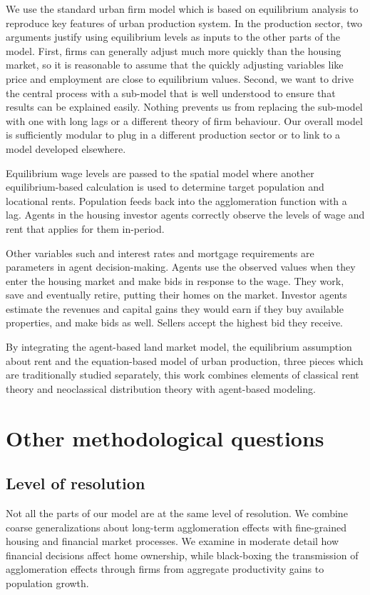 We use the standard urban firm model which is based on equilibrium analysis to reproduce key features of urban production system. In the production sector, two arguments justify using equilibrium levels as inputs to the other parts of the model. First, firms can generally adjust much more quickly than the housing market, so it is reasonable to assume that the quickly adjusting variables like price and employment are close to equilibrium values.  Second, we want to drive the central process with a sub-model that is well understood to ensure that results can be explained easily. Nothing prevents us from replacing the sub-model with one with long lags or a different theory of firm behaviour. Our overall model is sufficiently modular to plug in a different production sector or to link to a model developed elsewhere.

Equilibrium wage levels are passed to the spatial model where another equilibrium-based calculation is used to determine target population and locational rents. Population feeds back into the  agglomeration function with a lag. Agents in the housing investor agents correctly observe the levels of wage and rent that applies for them in-period. 

Other variables such and interest rates and mortgage requirements are parameters in agent decision-making. Agents use the observed values when they enter the housing market and make bids in response to the wage. They work, save and eventually retire, putting their homes on the market. Investor agents estimate the revenues and capital gains they would earn if they buy available properties, and make bids as well. Sellers accept the highest bid they receive. 

By integrating the agent-based land market model, the equilibrium assumption about rent and the equation-based model of urban production, three pieces which are traditionally studied separately, this work combines elements of classical rent theory and neoclassical distribution theory with agent-based modeling.








\section{Other methodological questions}\label{sec-other}
\subsection{Level of resolution}
Not all the parts of our model are at the same level of resolution. We combine coarse generalizations about long-term agglomeration effects with fine-grained housing and financial market processes. We examine in moderate detail how financial decisions affect home ownership, while black-boxing the transmission of agglomeration effects through firms from aggregate productivity gains to population growth. 

